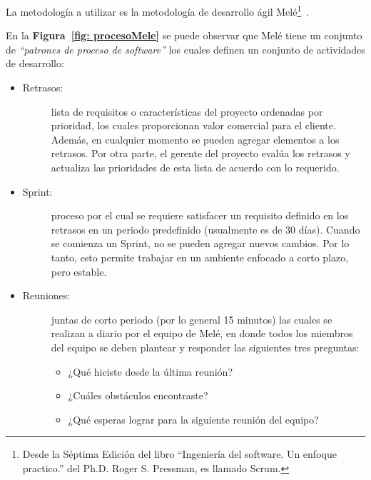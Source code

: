 La metodología a utilizar es la metodología de desarrollo ágil Melé\footnote{Desde la Séptima Edición del libro ``Ingeniería del software. Un enfoque practico.'' del Ph.D. Roger S. Pressman, es llamado Scrum. }~\cite{7}.

En la \textbf{Figura~\ref{fig: procesoMele}} se puede observar que Melé tiene un conjunto de \emph{``patrones de proceso de software''} los cuales definen un conjunto de actividades de desarrollo:

\begin{itemize}
    \item   \begin{description}
                \item[Retrasos:] lista de requisitos o características del proyecto ordenadas por prioridad, los cuales proporcionan valor comercial para el cliente. Además, en cualquier momento se pueden agregar elementos a los retrasos. Por otra parte, el gerente del proyecto evalúa los retrasos y actualiza las prioridades de esta lista de acuerdo con lo requerido. 
            \end{description}

    \item   \begin{description}
                \item[Sprint:] proceso por el cual se requiere satisfacer un requisito definido en los retrasos en un periodo predefinido (usualmente es de 30 días). Cuando se comienza un Sprint, no se pueden agregar nuevos cambios. Por lo tanto, esto permite trabajar en un ambiente enfocado a corto plazo, pero estable.
            \end{description}

    \item   \begin{description}
                \item[Reuniones:] juntas de corto periodo (por lo general 15 minutos) las cuales se realizan a diario por el equipo de Melé, en donde todos los miembros del equipo se deben plantear y responder las siguientes tres preguntas: 
% 
                \begin{itemize}
                    \item ¿Qué hiciste desde la última reunión?

                    \item ¿Cuáles obstáculos encontraste? 

                    \item ¿Qué esperas lograr para la siguiente reunión del equipo?
                \end{itemize}


\end{description}
\end{itemize}
